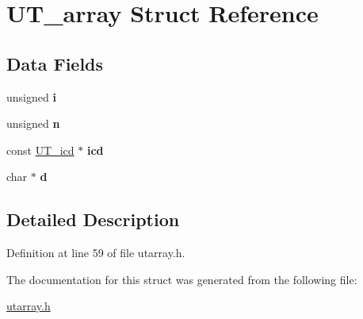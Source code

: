 \hypertarget{struct_u_t__array}{
\section{UT\_\-array Struct Reference}
\label{struct_u_t__array}
}
\subsection*{Data Fields}
\begin{DoxyCompactItemize}
\item 
\hypertarget{struct_u_t__array_add4a738223f032481193cc5901cef56e}{
unsigned {\bfseries i}}
\label{struct_u_t__array_add4a738223f032481193cc5901cef56e}

\item 
\hypertarget{struct_u_t__array_a48798687ef8b6a5ba3fbe806520c5824}{
unsigned {\bfseries n}}
\label{struct_u_t__array_a48798687ef8b6a5ba3fbe806520c5824}

\item 
\hypertarget{struct_u_t__array_a71133dfd3995f144316186531e255eff}{
const \hyperlink{struct_u_t__icd}{UT\_\-icd} $\ast$ {\bfseries icd}}
\label{struct_u_t__array_a71133dfd3995f144316186531e255eff}

\item 
\hypertarget{struct_u_t__array_aab8159eaea37e87d0af22c97758c7b77}{
char $\ast$ {\bfseries d}}
\label{struct_u_t__array_aab8159eaea37e87d0af22c97758c7b77}

\end{DoxyCompactItemize}


\subsection{Detailed Description}


Definition at line 59 of file utarray.h.



The documentation for this struct was generated from the following file:\begin{DoxyCompactItemize}
\item 
\hyperlink{utarray_8h}{utarray.h}\end{DoxyCompactItemize}

